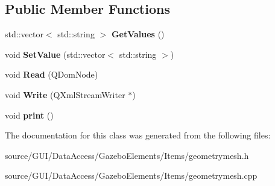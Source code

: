 \subsection*{Public Member Functions}
\begin{DoxyCompactItemize}
\item 
std\+::vector$<$ std\+::string $>$ {\bfseries Get\+Values} ()\label{class_geometry_mesh_af040c83a9af4a3c5e41ca28cf8d78fa7}

\item 
void {\bfseries Set\+Value} (std\+::vector$<$ std\+::string $>$)\label{class_geometry_mesh_a0e09313e761114f64ea3f59ecd41fe10}

\item 
void {\bfseries Read} (Q\+Dom\+Node)\label{class_geometry_mesh_ad66a6f47733f797c48031eac74620a3d}

\item 
void {\bfseries Write} (Q\+Xml\+Stream\+Writer $\ast$)\label{class_geometry_mesh_a9acb517ab40f6f7199517202261b0f3e}

\item 
void {\bfseries print} ()\label{class_geometry_mesh_a7a2003565d3079ee24d2ed533489a229}

\end{DoxyCompactItemize}


The documentation for this class was generated from the following files\+:\begin{DoxyCompactItemize}
\item 
source/\+G\+U\+I/\+Data\+Access/\+Gazebo\+Elements/\+Items/geometrymesh.\+h\item 
source/\+G\+U\+I/\+Data\+Access/\+Gazebo\+Elements/\+Items/geometrymesh.\+cpp\end{DoxyCompactItemize}
